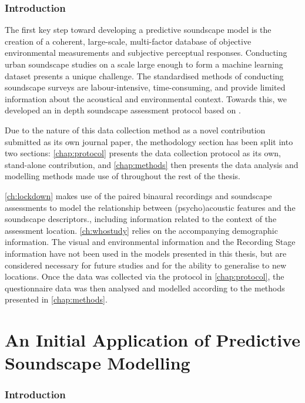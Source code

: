 \documentclass[oneside,fontsize=11pt,titlepage,chapterprefix=true
]{scrbook}
\begin{document}
\section*{Introduction}
The first key step toward developing a predictive soundscape model is the creation of a coherent, large-scale, multi-factor database of objective environmental measurements and subjective perceptual responses. Conducting urban soundscape studies on a scale large enough to form a machine learning dataset presents a unique challenge. The standardised methods of conducting soundscape surveys \citep{ISO12913Part2} are labour-intensive, time-consuming, and provide limited information about the acoustical and environmental context. Towards this, we developed an in depth soundscape assessment protocol based on \citet{ISO12913Part2}. 

Due to the nature of this data collection method as a novel contribution submitted as its own journal paper, the methodology section has been split into two sections: \cref{chap:protocol} presents the data collection protocol as its own, stand-alone contribution, and \cref{chap:methods} then presents the data analysis and modelling methods made use of throughout the rest of the thesis. 

\cref{ch:lockdown} makes use of the paired binaural recordings and soundscape assessments to model the relationship between (psycho)acoustic features and the soundscape descriptors., including information related to the context of the assessment location. \cref{ch:whostudy} relies on the accompanying demographic information. The visual and environmental information and the Recording Stage information have not been used in the models presented in this thesis, but are considered necessary for future studies and for the ability to generalise to new locations. Once the data was collected via the protocol in \cref{chap:protocol}, the questionnaire data was then analysed and modelled according to the methods presented in \cref{chap:methods}.





\part{An Initial Application of Predictive Soundscape Modelling}
\label{part:Lockdown}
\section*{Introduction}
\end{document}
